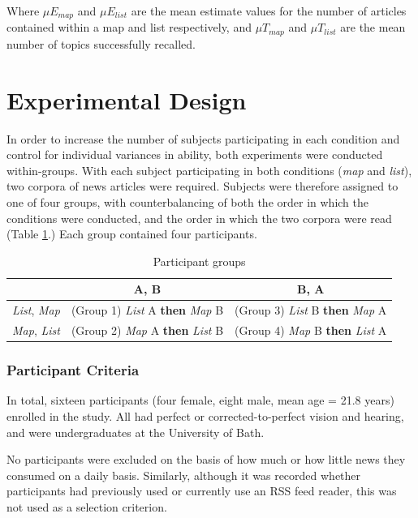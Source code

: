 Where $\mu{E}_{map}$ and $\mu{E}_{list}$ are the mean estimate values for the number of articles contained within a map and list respectively, and $\mu{T}_{map}$ and $\mu{T}_{list}$ are the mean number of topics successfully recalled.

\section{Experimental Design}

In order to increase the number of subjects participating in each condition and control for individual variances in ability, both experiments were conducted within-groups. With each subject participating in both conditions (\textit{map} and \textit{list}), two corpora of news articles were required. Subjects were therefore assigned to one of four groups, with counterbalancing of both the order in which the conditions were conducted, and the order in which the two corpora were read (Table \ref{tab:experimentalgroups}.) Each group contained four participants.\\

\begin{table}[htbp!]
\centering
\begin{tabular}{|r|c|c|}
\hline
  & A, B & B, A\\
\hline
\textit{List}, \textit{Map} & (Group 1) \textit{List} A \textbf{then} \textit{Map} B & (Group 3) \textit{List} B \textbf{then} \textit{Map} A \\
\hline
\textit{Map}, \textit{List} & (Group 2) \textit{Map} A \textbf{then} \textit{List} B & (Group 4) \textit{Map} B \textbf{then} \textit{List} A \\
\hline
\end{tabular}
\caption{Participant groups} \label{tab:experimentalgroups}
\end{table}

\subsubsection{Participant Criteria}
In total, sixteen participants (four female, eight male, mean age = 21.8 years) enrolled in the study. All had perfect or corrected-to-perfect vision and hearing, and were undergraduates at the University of Bath.

No participants were excluded on the basis of how much or how little news they consumed on a daily basis. Similarly, although it was recorded whether participants had previously used or currently use an RSS feed reader, this was not used as a selection criterion. 

